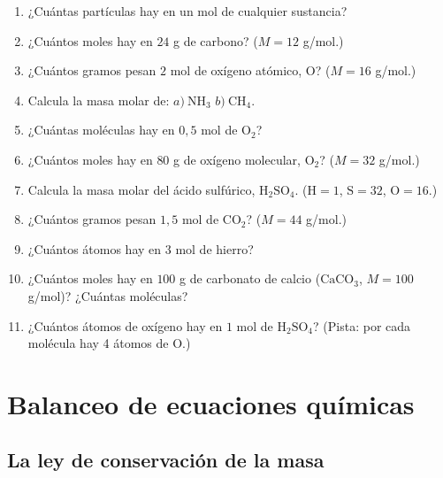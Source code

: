 \documentclass[12pt, letterpaper]{article}
\begin{document}
\begin{enumerate}[leftmargin=*, resume]
  \item \facil{} ¿Cuántas partículas hay en un mol de cualquier sustancia?

  \item \facil{} ¿Cuántos moles hay en $24$ g de carbono? ($M = 12$ g/mol.)

  \item \facil{} ¿Cuántos gramos pesan $2$ mol de oxígeno atómico, O? ($M = 16$ g/mol.)

  \item \facil{} Calcula la masa molar de: $a)\ \text{NH}_3$ \quad $b)\ \text{CH}_4$.

  \item \facil{} ¿Cuántas moléculas hay en $0{,}5$ mol de $\text{O}_2$?

  \item \medio{} ¿Cuántos moles hay en $80$ g de oxígeno molecular, $\text{O}_2$? ($M = 32$ g/mol.)

  \item \medio{} Calcula la masa molar del ácido sulfúrico, $\text{H}_2\text{SO}_4$. ($\text{H} = 1$, $\text{S} = 32$, $\text{O} = 16$.)

  \item \medio{} ¿Cuántos gramos pesan $1{,}5$ mol de $\text{CO}_2$? ($M = 44$ g/mol.)

  \item \medio{} ¿Cuántos átomos hay en $3$ mol de hierro?

  \item \dificil{} ¿Cuántos moles hay en $100$ g de carbonato de calcio ($\text{CaCO}_3$, $M = 100$ g/mol)? ¿Cuántas moléculas?

  \item \dificil{} ¿Cuántos átomos de oxígeno hay en $1$ mol de $\text{H}_2\text{SO}_4$? (Pista: por cada molécula hay 4 átomos de O.)
\end{enumerate}

\section{Balanceo de ecuaciones químicas}

\subsection{La ley de conservación de la masa}
\end{document}
